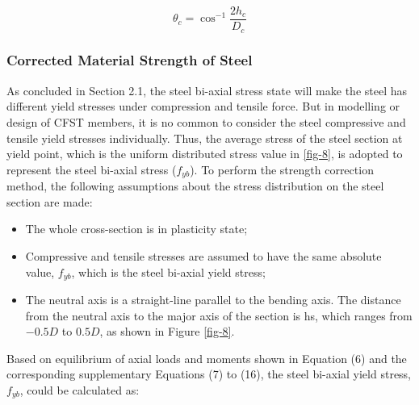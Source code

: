 \documentclass[12pt,a4]{article}
\begin{document}
	\begin{equation}\label{eq-5}
	\theta_c = \cos^{-1}{\frac{2h_c}{D_c}}
	\end{equation}
	\par
	\subsubsection{Corrected Material Strength of Steel}
	As concluded in Section 2.1, the steel bi-axial stress state will make the steel has different yield stresses under compression and tensile force. But in modelling or design of CFST members, it is no common to consider the steel compressive and tensile yield stresses individually. Thus, the average stress of the steel section at yield point, which is  the uniform distributed stress value in \ref{fig-8}, is adopted to represent the steel bi-axial stress ($f_{yb}$). To perform the strength correction method, the following assumptions about the stress distribution on the steel section are made:
	\begin{itemize}
		\item The whole cross-section is in plasticity state;
		
		\item Compressive and tensile stresses are assumed to have the same absolute value, $f_{yb}$, which is the steel bi-axial yield stress;
		
		\item The neutral axis is a straight-line parallel to the bending axis. The distance from the neutral axis to the major axis of the section is hs, which ranges from $−0.5D$ to $0.5D$, as shown in Figure \ref{fig-8}.
	\end{itemize}
	\par
	Based on equilibrium of axial loads and moments shown in Equation (6) and the corresponding supplementary Equations (7) to (16), the steel bi-axial yield stress, $f_{yb}$, could be calculated as:
	
\end{document}

